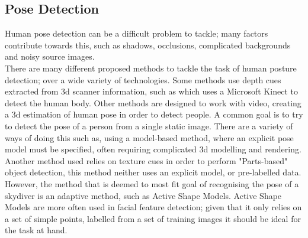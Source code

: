 \documentclass[a4paper, 12pt]{article}
\begin{document}
\subsection{Pose Detection}
%
Human pose detection can be a difficult problem to tackle; many factors contribute towards this, such as shadows, occlusions, complicated backgrounds and noisy source images.\\
There are many different proposed methods to tackle the task of human posture detection; over a wide variety of technologies. Some methods use depth cues extracted from 3d scanner information, such as \cite{kinect_IR} which uses a Microsoft Kinect to detect the human body. Other methods are designed to work with video\cite{video}, creating a 3d estimation of human pose in order to detect people. A common goal is to try to detect the pose of a person from a single static image. There are a variety of ways of doing this such as, using a model-based method, where an explicit pose model must be specified, often requiring complicated 3d modelling and rendering\cite{model-based}. Another method used relies on texture cues in order to perform "Parts-based" object detection\cite{monocular_still_images}, this method neither uses an explicit model, or pre-labelled data.\\
However, the method that is deemed to most fit goal of recognising the pose of a skydiver is an adaptive method, such as Active Shape Models. Active Shape Models are more often used in facial feature detection\cite{cootes}\cite{face_recognition}; given that it only relies on a set of simple points, labelled from a set of training images it should be ideal for the task at hand.
%
\end{document}
